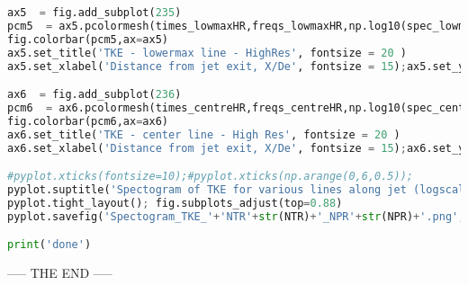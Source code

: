 \begin{lstlisting}[language=Python]
ax5  = fig.add_subplot(235)
pcm5  = ax5.pcolormesh(times_lowmaxHR,freqs_lowmaxHR,np.log10(spec_lowmaxHR),cmap='jet')
fig.colorbar(pcm5,ax=ax5)
ax5.set_title('TKE - lowermax line - HighRes', fontsize = 20 )  
ax5.set_xlabel('Distance from jet exit, X/De', fontsize = 15);ax5.set_ylabel('wavenumbers*De', fontsize = 15)

ax6  = fig.add_subplot(236)
pcm6  = ax6.pcolormesh(times_centreHR,freqs_centreHR,np.log10(spec_centreHR),cmap='jet')
fig.colorbar(pcm6,ax=ax6)
ax6.set_title('TKE - center line - High Res', fontsize = 20 )  
ax6.set_xlabel('Distance from jet exit, X/De', fontsize = 15);ax6.set_ylabel('wavenumbers*De', fontsize = 15)

#pyplot.xticks(fontsize=10);#pyplot.xticks(np.arange(0,6,0.5));
pyplot.suptitle('Spectogram of TKE for various lines along jet (logscaled)'+' at NTR '+str(NTR)+', NPR '+str(NPR), fontsize =25 )
pyplot.tight_layout(); fig.subplots_adjust(top=0.88)
pyplot.savefig('Spectogram_TKE_'+'NTR'+str(NTR)+'_NPR'+str(NPR)+'.png', dpi=300)

print('done')

\end{lstlisting}
\vspace{10mm}
\begin{center}
----- THE END -----
\end{center}